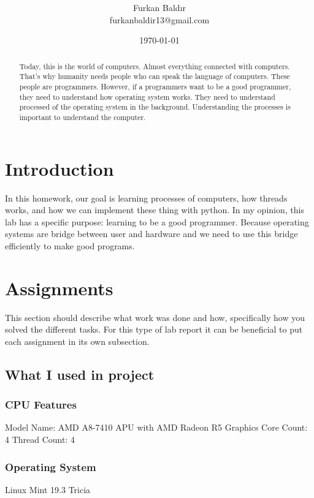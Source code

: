 \documentclass[]{article}
\title{\spacecaps{Assignment Report 1: Process and Thread Implementation}\\ \normalsize \spacesc{CENG2034, Operating Systems} }
\author{Furkan Baldır\\furkanbaldir13@gmail.com}
\date{\today}
\begin{document}
\maketitle

\begin{abstract}
	Today, this is the world of computers. Almost everything connected with computers. That's why humanity needs people who can speak the language of computers. These people are programmers.  However, if a programmers want to be a good programmer, they need to understand how operating system works. They need to understand processed of the operating system in the background. Understanding the processes is important to understand the computer.
\end{abstract}


\section{Introduction}
In this homework, our goal is learning processes of computers, how threads works, and how we can implement these thing with python. In my opinion, this lab has a specific purpose: learning to be a good programmer. Because operating systems are bridge between user and hardware and we need to use this bridge efficiently to make good programs.

\section{Assignments}
This section should describe what work was done and how, specifically how you solved the different tasks. For this type of lab report it can be beneficial to put each assignment in its own subsection.

\subsection{What I used in project}

\subsubsection*{CPU Features}
Model Name: AMD A8-7410 APU with AMD Radeon R5 Graphics\newline
Core Count: 4\newline
Thread Count: 4
\subsubsection*{Operating System}
Linux Mint 19.3 Tricia
\end{document}
